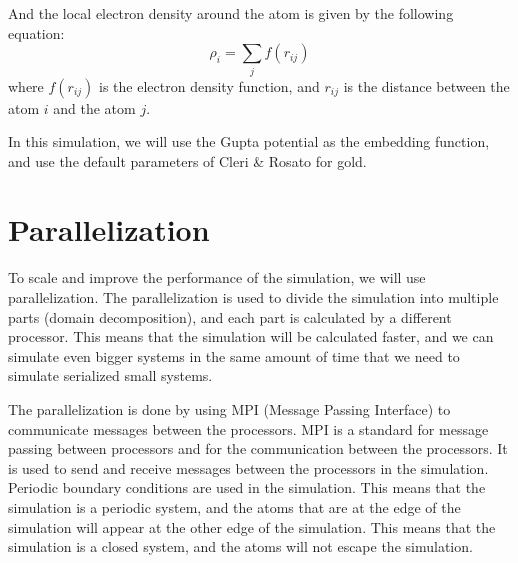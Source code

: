     And the local electron density around the atom is given by the following equation:
    \begin{equation}
        \rho_i = \sum_{j} f(r_{ij})
    \end{equation}
    where $f(r_{ij})$ is the electron density function, and $r_{ij}$ is the distance between the atom $i$ and the atom $j$.

    In this simulation, we will use the Gupta potential \cite{gupta1981lattice} as the embedding function, and use the default parameters of Cleri \& Rosato \cite{cleri1993tight} for gold.


\section{Parallelization}
    To scale and improve the performance of the simulation, we will use parallelization. The parallelization is used to divide the simulation into multiple parts (domain decomposition), and each part is calculated by a different processor. This means that the simulation will be calculated faster, and we can simulate even bigger systems in the same amount of time that we need to simulate serialized small systems.  

    The parallelization is done by using MPI (Message Passing Interface) to communicate messages between the processors. MPI is a standard for message passing between processors and for the communication between the processors. It is used to send and receive messages between the processors in the simulation.
    Periodic boundary conditions are used in the simulation. This means that the simulation is a periodic system, and the atoms that are at the edge of the simulation will appear at the other edge of the simulation. This means that the simulation is a closed system, and the atoms will not escape the simulation.